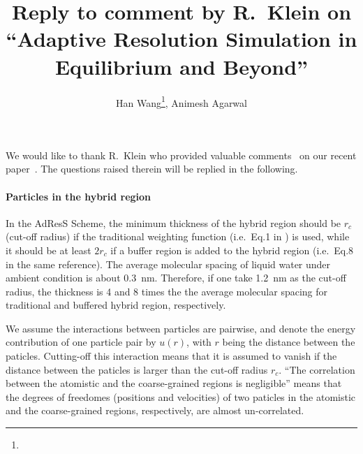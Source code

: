 \documentclass[epjST]{svjour}
\begin{document}
%
\title{Reply to comment by R.~Klein on ``Adaptive Resolution Simulation in Equilibrium and Beyond''}
\author{Han Wang\fnmsep\thanks{}, Animesh Agarwal}
%
%
%
\maketitle
%

We would like to thank R.~Klein who provided valuable comments~\cite{klein2015comment}
on our recent paper~\cite{wang2015adaptive}.
The questions raised therein will be replied in the following.

\paragraph{Particles in the hybrid region}
In the AdResS Scheme, the minimum thickness of the hybrid region
should be $r_c$ (cut-off radius) if the traditional weighting function
(i.e.~Eq.1 in \cite{wang2015adaptive}) is used, while it should be at least
$2r_c$ if a buffer region  is added to the hybrid
region (i.e.~Eq.8 in the same reference).
The average molecular spacing of liquid water under ambient
condition is about 0.3~nm. Therefore, if one take 1.2~nm as the cut-off
radius, the thickness is 4 and 8 times the
the average molecular spacing for traditional and buffered hybrid region, respectively.

We assume the interactions between particles are pairwise, and denote
the energy contribution of one particle pair by $u(r)$, with $r$ being the distance
between the paticles. Cutting-off this interaction means that it is assumed to vanish
if the distance between the paticles is larger than the cut-off radius $r_c$.
``The correlation between the atomistic and the coarse-grained
regions is negligible'' means that the
degrees of freedomes (positions and velocities) of two paticles
in the atomistic and the coarse-grained regions, respectively, are almost un-correlated.
\end{document}
